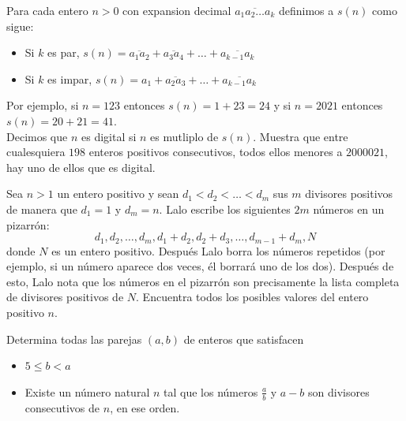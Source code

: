 \documentclass[11pt]{scrartcl}
\begin{document}
\begin{problem}
[2021/5] Para cada entero $n>0$ con expansion decimal $\overline{a_1a_2\ldots a_k}$ definimos a $s(n)$ como sigue:
\begin{itemize}
\item Si $k$ es par, $s(n)=\overline{a_1a_2}+\overline{a_3a_4}+\ldots+\overline{a_{k-1}a_k}$
\item Si $k$ es impar, $s(n)=a_1+\overline{a_2a_3}+\ldots+\overline{a_{k-1}a_k}$
\end{itemize}
Por ejemplo, si $n=123$ entonces $s(n)=1+23=24$ y si $n=2021$ entonces $s(n)=20+21=41$.\\
Decimos que $n$ es digital si $n$ es mutliplo de $s(n)$. Muestra que entre cualesquiera $198$ enteros positivos consecutivos, todos ellos menores a $2000021$, hay uno de ellos que es digital.
\end{problem}
\begin{problem}
    [2022/5] 
    Sea $n>1$ un entero positivo y sean $d_1< d_2< \dots< d_m$ sus $m$ divisores positivos de manera que $d_1=1$ y $d_m=n$. Lalo escribe los siguientes $2m$ números en un pizarrón:
\[d_1,d_2,\dots,d_m,d_1+d_2,d_2+d_3,\dots,d_{m-1}+d_m,N\]
donde $N$ es un entero positivo. Después Lalo borra los números repetidos (por ejemplo, si un número aparece dos veces, él borrará uno de los dos). Después de esto, Lalo nota que los números en el pizarrón son precisamente la lista completa de divisores positivos de $N$. Encuentra todos los posibles valores del entero positivo $n$.
    
\end{problem}

\begin{problem} [2024/2]
    Determina todas las parejas $(a,b)$ de enteros que satisfacen
    \begin{itemize}
        \item $5 \leq b < a$
        \item Existe un número natural $n$ tal que los números $\frac ab$ y $a-b$ son divisores consecutivos de $n$, en ese orden.
    \end{itemize}
\end{problem}
\end{document}
